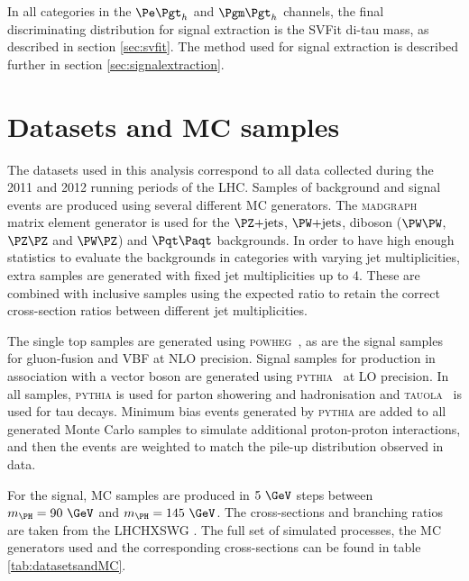 In all categories in the $\etau$ and $\mutau$ channels, the final discriminating
distribution for signal extraction is the SVFit di-tau mass, as described in
section \ref{sec:svfit}. The method used for signal extraction is described
further in section \ref{sec:signalextraction}.

\section{Datasets and \ac{MC} samples}
\label{sec:dataandMC}

The datasets used in this analysis correspond to all data collected during the 2011 and
2012 running periods of the \ac{LHC}. Samples of background and signal events are produced using several different
\ac{MC} generators. The \textsc{madgraph}~\cite{Alwall:2011uj} matrix element
generator is used for the $\ZJets$, $\WJets$, diboson ($\PW\PW$, $\PZ\PZ$ and
$\PW\PZ$) and $\ttbar$ backgrounds. 
In order to have high enough statistics to evaluate the
backgrounds in categories with varying jet multiplicities, extra samples are
generated with fixed jet multiplicities up to 4. These are combined with
inclusive samples using the expected ratio to retain the correct cross-section
ratios between different jet multiplicities. 

The single top samples are generated using
\textsc{powheg}~\cite{Frixione:2007vw,Alioli:2010xd,Alioli:2010xa}, as are the
signal samples for gluon-fusion and \ac{VBF} at \ac{NLO} precision. Signal
samples for production in association with a vector boson are generated using
\textsc{pythia}~\cite{Sjostrand:2006za} at \ac{LO} precision. In all
samples, \textsc{pythia} is used for parton showering and hadronisation and
\textsc{tauola}~\cite{TAUOLA} is used for tau decays. Minimum bias events
generated by \textsc{pythia} are added to all generated Monte Carlo samples
to simulate additional proton-proton interactions, and then the events are
weighted to match the pile-up distribution observed in data. 

For the signal, \ac{MC} samples are produced in $5~\GeV$ steps between
$m_{\PH}=90~\GeV$ and $m_{\PH}=145~\GeV$. The cross-sections and branching ratios 
are taken from the \ac{LHCHXSWG}
\cite{LHCHiggsCrossSectionWorkingGroup:2011ti,Dittmaier:2012vm,Heinemeyer:2013tqa}.
The full set of simulated processes, the \ac{MC} generators used and the
corresponding cross-sections can be found in table \ref{tab:datasetsandMC}.

